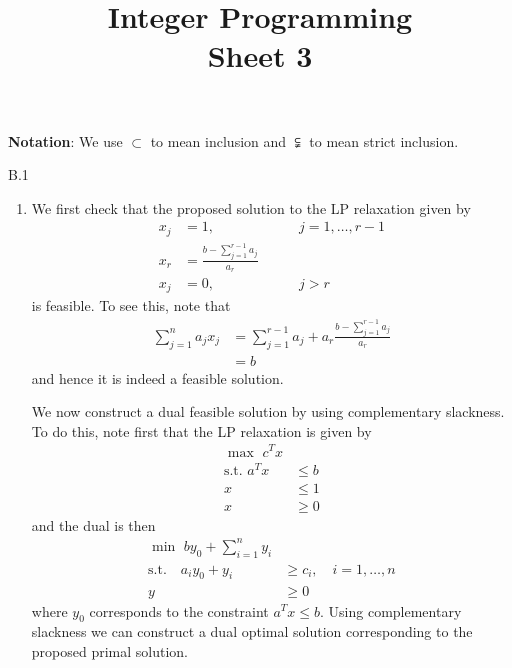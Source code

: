 \documentclass[a4paper]{article}
\title{Integer Programming \\ Sheet 3}
\begin{document}
  \maketitle
  \textbf{Notation}: We use $ \subset $ to mean inclusion and $ \subsetneqq $ to mean strict inclusion.
  \begin{exercise}{B.1}
    \begin{enumerate}[label=(\roman*)]
      \item We first check that the proposed solution to the LP relaxation given by
        \begin{align*}
          x_j &= 1, \quad\quad\quad\quad\quad\quad j=1, \ldots, r-1 \\
          x_r &=  \frac{b - \sum_{j = 1}^{r -1} a_j}{a_r} \\
          x_j &= 0, \quad\quad\quad\quad\quad\quad j>r
        \end{align*}
        is feasible. To see this, note that
        \begin{align*}
          \sum_{j = 1}^{n} a_jx_j &= \sum_{j = 1}^{r-1} a_j + a_r \frac{b - \sum_{j = 1}^{r - 1} a_j}{a_r} \\
                                  &= b
        \end{align*}
        and hence it is indeed a feasible solution.

        We now construct a dual feasible solution by using complementary slackness. To do this, note first that the LP relaxation is given by
        \begin{align*}
          \max\,\, c^{T}x& \\
          \text{s.t. }  a^{T}x &\leq b \\
          x &\leq 1 \\
          x &\geq 0
        \end{align*}
        and the dual is then
        \begin{align*}
          \min\,\, by_0 + \sum_{i = 1}^{n} y_i& \\
          \text{s.t.}\quad a_i y_0 + y_i &\geq c_i,\quad i = 1,\ldots, n \\
          y &\geq 0
        \end{align*}
        where $ y_0 $ corresponds to the constraint $ a^{T}x \leq b $. Using complementary slackness we can construct a dual optimal solution corresponding to the proposed primal solution.


\end{enumerate}
\end{exercise}
\end{document}
